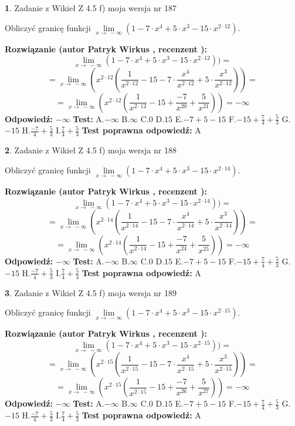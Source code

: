 \documentclass[12pt, a4paper]{article}
\theoremstyle{definition} %
\newtheorem{zad}{}
\newcommand{\zadStart}[1]{\begin{zad}#1\newline}
\newcommand{\zadStop}{\end{zad}}
\newcommand{\rozwStart}[2]{\noindent \textbf{Rozwiązanie (autor #1 , recenzent #2): }\newline}
\newcommand{\rozwStop}{\newline}
\newcommand{\odpStart}{\noindent \textbf{Odpowiedź:}\newline}
\newcommand{\odpStop}{\newline}
\newcommand{\testStart}{\noindent \textbf{Test:}\newline}
\newcommand{\testStop}{\newline}
\newcommand{\kluczStart}{\noindent \textbf{Test poprawna odpowiedź:}\newline}
\newcommand{\kluczStop}{\newline}
\begin{document}
\zadStart{Zadanie z Wikieł Z 4.5 f) moja wersja nr 187}



Obliczyć granicę funkcji  $\lim\limits_{x\to\ -\infty}(1 - 7 \cdot x^{4}+5 \cdot x^{3}- 15 \cdot x^{2\cdot12})$.
\zadStop
\rozwStart{Patryk Wirkus}{}
$$\lim\limits_{x\to\ -\infty}(1 - 7 \cdot x^{4}+5 \cdot x^{3}- 15 \cdot x^{2\cdot12}))=$$
$$=\lim\limits_{x\to\ -\infty}(x^{2\cdot12}(\frac{1}{x^{2\cdot12}}-15 -7 \cdot \frac{x^{4}}{x^{2\cdot12}}+5 \cdot \frac{x^{3}}{x^{2\cdot12}}))=$$
$$=\lim\limits_{x\to\ -\infty}(x^{2\cdot12}(\frac{1}{x^{2\cdot12}}-15 + \frac{-7}{x^{20}}+ \frac{5}{x^{21}}))=-\infty$$
\rozwStop
\odpStart
$-\infty$
\odpStop
\testStart
A.$-\infty$ B.$\infty$ C.$0$ D.$15$ E.$-7 + 5 - 15$
F.$-15+\frac{7}{4}+\frac{5}{3}$ G.$-15$
H.$\frac{-7}{4}+\frac{5}{3}$
I.$\frac{7}{4}+\frac{5}{3}$
\testStop
\kluczStart
A
\kluczStop



\zadStart{Zadanie z Wikieł Z 4.5 f) moja wersja nr 188}



Obliczyć granicę funkcji  $\lim\limits_{x\to\ -\infty}(1 - 7 \cdot x^{4}+5 \cdot x^{3}- 15 \cdot x^{2\cdot14})$.
\zadStop
\rozwStart{Patryk Wirkus}{}
$$\lim\limits_{x\to\ -\infty}(1 - 7 \cdot x^{4}+5 \cdot x^{3}- 15 \cdot x^{2\cdot14}))=$$
$$=\lim\limits_{x\to\ -\infty}(x^{2\cdot14}(\frac{1}{x^{2\cdot14}}-15 -7 \cdot \frac{x^{4}}{x^{2\cdot14}}+5 \cdot \frac{x^{3}}{x^{2\cdot14}}))=$$
$$=\lim\limits_{x\to\ -\infty}(x^{2\cdot14}(\frac{1}{x^{2\cdot14}}-15 + \frac{-7}{x^{24}}+ \frac{5}{x^{25}}))=-\infty$$
\rozwStop
\odpStart
$-\infty$
\odpStop
\testStart
A.$-\infty$ B.$\infty$ C.$0$ D.$15$ E.$-7 + 5 - 15$
F.$-15+\frac{7}{4}+\frac{5}{3}$ G.$-15$
H.$\frac{-7}{4}+\frac{5}{3}$
I.$\frac{7}{4}+\frac{5}{3}$
\testStop
\kluczStart
A
\kluczStop



\zadStart{Zadanie z Wikieł Z 4.5 f) moja wersja nr 189}



Obliczyć granicę funkcji  $\lim\limits_{x\to\ -\infty}(1 - 7 \cdot x^{4}+5 \cdot x^{3}- 15 \cdot x^{2\cdot15})$.
\zadStop
\rozwStart{Patryk Wirkus}{}
$$\lim\limits_{x\to\ -\infty}(1 - 7 \cdot x^{4}+5 \cdot x^{3}- 15 \cdot x^{2\cdot15}))=$$
$$=\lim\limits_{x\to\ -\infty}(x^{2\cdot15}(\frac{1}{x^{2\cdot15}}-15 -7 \cdot \frac{x^{4}}{x^{2\cdot15}}+5 \cdot \frac{x^{3}}{x^{2\cdot15}}))=$$
$$=\lim\limits_{x\to\ -\infty}(x^{2\cdot15}(\frac{1}{x^{2\cdot15}}-15 + \frac{-7}{x^{26}}+ \frac{5}{x^{27}}))=-\infty$$
\rozwStop
\odpStart
$-\infty$
\odpStop
\testStart
A.$-\infty$ B.$\infty$ C.$0$ D.$15$ E.$-7 + 5 - 15$
F.$-15+\frac{7}{4}+\frac{5}{3}$ G.$-15$
H.$\frac{-7}{4}+\frac{5}{3}$
I.$\frac{7}{4}+\frac{5}{3}$
\testStop
\kluczStart
A
\kluczStop
\end{document}
